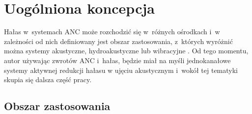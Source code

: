 \section{Uogólniona koncepcja}

Hałas w~systemach ANC może rozchodzić się w~różnych ośrodkach i~w zależności od
nich definiowany jest obszar zastosowania, z~których wyróżnić można systemy
akustyczne, hydroakustyczne lub wibracyjne \cite{bib:kuo_morgan}. Od tego
momentu, autor używając zwrotów ANC i~hałas, będzie miał na myśli jednokanałowe
systemy aktywnej redukcji hałasu w ujęciu akustycznym i~wokół tej tematyki
skupia się dalsza część pracy.

\subsection{Obszar zastosowania}

